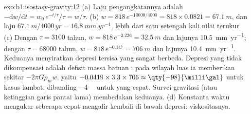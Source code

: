 \begin{solution}{exo:b1:isostasy-gravity:12}
(a) Laju pengangkatannya adalah $-\mathrm dw/\mathrm dt = w_0\,e^{-t/\tau}/\tau = w/\tau$.
(b) $w = 818\,e^{-10000/4000} = 818\times0.0821 = \qty{67.1}{m}$, dan laju
$\qty{67.1}{m}/\num{4000}\,\unit{yr} = \qty{16.8}{mm.yr^{-1}}$, lebih dari satu
setengah kali nilai terukur. (c) Dengan $\tau = 3100$ tahun, $w =
818\,e^{-3.226} = \qty{32.5}{m}$ dan lajunya \qty{10.5}{mm.yr^{-1}}; dengan
$\tau = \num{68000}$ tahun, $w = 818\,e^{-0.147} = \qty{706}{m}$ dan lajunya
\qty{10.4}{mm.yr^{-1}}. Keduanya menyiratkan depresi tersisa yang sangat berbeda.
Depresi yang tidak dikompensasi adalah defisit massa batuan : pada wilayah
luas ia memberikan  sekitar $-2\pi G\rho_m w$, yaitu
$-0.0419\times3.3\times706 \approx \qty{-98}{\milli\gal}$ untuk kasus lambat,
dibanding \qty{-4}{\milli\gal} untuk yang cepat. Survei gravitasi (atau ketinggian
garis pantai lama) membedakan keduanya. (d) Konstanta waktu mengukur seberapa cepat
 mengalir kembali di bawah depresi: viskositasnya.
\end{solution}


